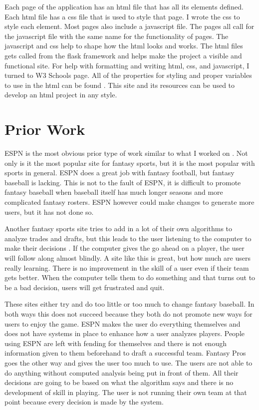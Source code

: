 \documentclass[10pt,twocolumn]{article}
\begin{document}
	Each page of the application has an html file that has all its elements defined. Each html file has a css file that is used to style that page. I wrote the css to style each element. Most pages also include a javascript file. The pages all call for the javascript file with the same name for the functionality of pages. The javascript and css help to shape how the html looks and works. The html files gets called from the flask framework and helps make the project a visible and functional site.  For help with formatting and writing html, css, and javascript, I turned to W3 Schools page. All of the properties for styling and proper variables to use in the html can be found \cite{W3schools}. This site and its resources can be used to develop an html project in any style.
	
\section{Prior Work}
	ESPN is the most obvious prior type of work similar to what I worked on \cite{ESPN}. Not only is it the most popular site for fantasy sports, but it is the most popular with sports in general. ESPN does a great job with fantasy football, but fantasy baseball is lacking. This is not to the fault of ESPN, it is difficult to promote fantasy baseball when baseball itself has much longer seasons and more complicated fantasy rosters. ESPN however could make changes to generate more users, but it has not done so.
	
	Another fantasy sports site tries to add in a lot of their own algorithms to analyze trades and drafts, but this leads to the user listening to the computer to make their decisions \cite{FantasyPros}. If the computer gives the go ahead on a player, the user will follow along almost blindly. A site like this is great, but how much are users really learning. There is no improvement in the skill of a user even if their team gets better. When the computer tells them to do something and that turns out to be a bad decision, users will get frustrated and quit.
	
	These sites either try and do too little or too much to change fantasy baseball. In both ways this does not succeed because they both do not promote new ways for users to enjoy the game. ESPN makes the user do everything themselves and does not have systems in place to enhance how a user analyzes players. People using ESPN are left with fending for themselves and there is not enough information given to them beforehand to draft a successful team. Fantasy Pros goes the other way and gives the user too much to use. The users are not able to do anything without computed analysis being put in front of them. All their decisions are going to be based on what the algorithm says and there is no development of skill in playing. The user is not running their own team at that point because every decision is made by the system.
\end{document}
